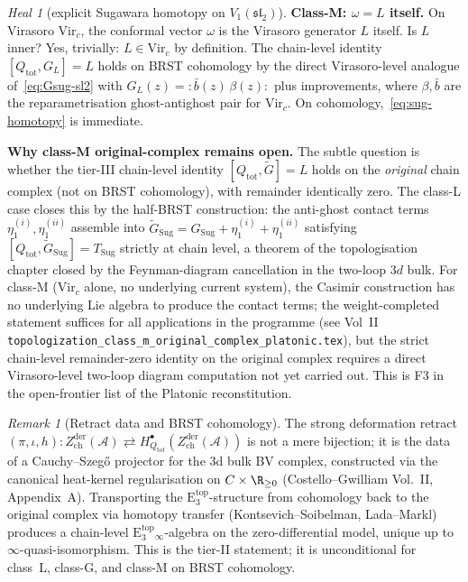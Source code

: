 \documentclass{article}
\theoremstyle{definition}
\theoremstyle{remark}
\newtheorem{remark}[theorem]{Remark}
\newtheorem{heal}[theorem]{Heal}
\newcommand{\Zder}{Z^{\mathrm{der}}_{\mathrm{ch}}}
\newcommand{\Etop}[1]{\mathrm{E}_{#1}^{\mathrm{top}}}
\newcommand{\fsl}{\mathfrak{sl}}
\newcommand{\Vir}{\mathrm{Vir}}
\newcommand{\cA}{\mathcal{A}}
\newcommand{\Sug}{T_{\mathrm{Sug}}}
\newcommand{\Gsug}{G_{\mathrm{Sug}}}
\newcommand{\nord}[1]{{:}#1{:}}
\begin{document}
\begin{heal}[explicit Sugawara homotopy on $V_1(\fsl_2)$]
\textbf{Class-M: $\omega = L$ itself.} On Virasoro $\Vir_c$, the
conformal vector $\omega$ is the Virasoro generator $L$ itself.
Is $L$ inner? Yes, trivially: $L\in \Vir_c$ by definition. The
chain-level identity $[Q_{\mathrm{tot}}, G_L] = L$ holds on BRST
cohomology by the direct Virasoro-level analogue of~\eqref{eq:Gsug-sl2}
with $G_L(z) = \nord{\bar b(z)\, \beta(z)}$ plus improvements, where
$\beta, \bar b$ are the reparametrisation ghost-antighost pair for
$\Vir_c$. On cohomology,~\eqref{eq:sug-homotopy} is immediate.

\textbf{Why class-M original-complex remains open.} The subtle
question is whether the tier-III chain-level identity
$[Q_{\mathrm{tot}}, \tilde G] = L$ holds on the \emph{original}
chain complex (not on BRST cohomology), with remainder identically
zero. The class-L case closes this by the half-BRST construction:
the anti-ghost contact terms $\eta_1^{(i)}, \eta_1^{(ii)}$ assemble
into $\tilde \Gsug = \Gsug + \eta_1^{(i)} + \eta_1^{(ii)}$ satisfying
$[Q_{\mathrm{tot}}, \tilde \Gsug] = \Sug$ strictly at chain level, a
theorem of the topologisation chapter closed by the Feynman-diagram
cancellation in the two-loop $3d$ bulk. For class-M
($\Vir_c$ alone, no underlying current system), the Casimir
construction has no underlying Lie algebra to produce the contact
terms; the weight-completed statement suffices for all applications
in the programme (see Vol~II
\texttt{topologization\_class\_m\_original\_complex\_platonic.tex}),
but the strict chain-level remainder-zero identity on the original
complex requires a direct Virasoro-level two-loop diagram
computation not yet carried out. This is F3 in the open-frontier
list of the Platonic reconstitution.
\end{heal}

\begin{remark}[Retract data and BRST cohomology]
\label{rem:retract-data}
The strong deformation retract
$(\pi, \iota, h)\colon \Zder(\cA) \rightleftarrows
H^{\bullet}_{Q_{\mathrm{tot}}}(\Zder(\cA))$ is not a mere bijection;
it is the data of a Cauchy--Szeg\H{o} projector for the 3d bulk BV
complex, constructed via the canonical heat-kernel regularisation on
$C\times\R_{\geq 0}$ (Costello--Gwilliam \cite{CG} Vol.~II, Appendix~A).
Transporting the $\Etop{3}$-structure from cohomology back to the
original complex via homotopy transfer
(Kontsevich--Soibelman, Lada--Markl) produces a chain-level
$\Etop{3}_{\infty}$-algebra on the zero-differential model, unique up
to $\infty$-quasi-isomorphism. This is the tier-II statement; it is
unconditional for class~L, class-G, and class-M on BRST cohomology.
\end{remark}
\end{document}
